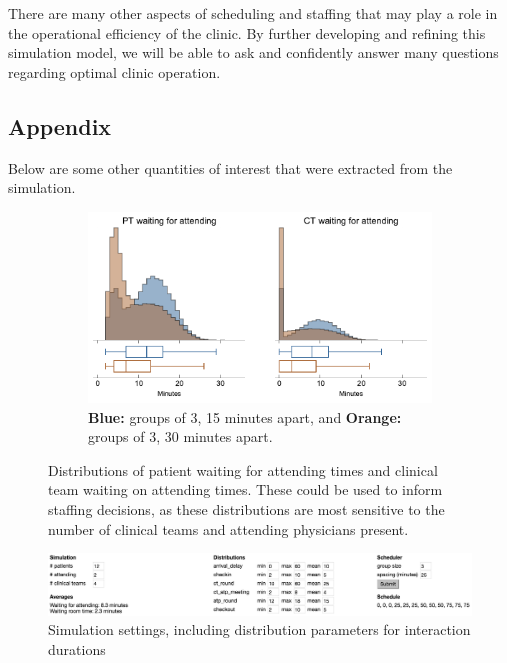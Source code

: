 \documentclass[11pt]{article}
\begin{document}
There are many other aspects of scheduling and staffing that may play a role in the operational efficiency of the clinic. By further developing and refining this simulation model, we will be able to ask and confidently answer many questions regarding optimal clinic operation.

\subsection*{Appendix}
Below are some other quantities of interest that were extracted from the simulation.
\begin{figure}[H]
  \begin{subfigure}[b]{\textwidth}\centering
  \includegraphics[width=0.85\linewidth]{3_15_3_30_hist2.pdf}
  \caption{\textbf{\textcolor{blue!80!white!60!black}{Blue:}} groups of 3, 15 minutes apart, and \textbf{\textcolor{orange!80!white!60!black}{Orange:}} groups of 3, 30 minutes apart.}
  \label{fig:compare-hist2}
  \end{subfigure}
  \caption{Distributions of patient waiting for attending times and clinical team waiting on attending times. These could be used to inform staffing decisions, as these distributions are most sensitive to the number of clinical teams and attending physicians present. }
\end{figure}
\begin{figure}[H]
  \includegraphics[width=\linewidth]{settings.png}
  \caption{Simulation settings, including distribution parameters for interaction durations}
  \label{fig:settings}
\end{figure}
\end{document}
